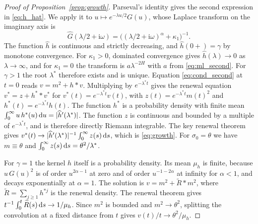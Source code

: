\begin{proof}[Proof of Proposition~\ref{prop:growth}] Parseval's identity gives the second expression in \eqref{eq:h_hat}. We apply it to $u\mapsto e^{-\lambda u/2}G(u)$, whose Laplace transform on the imaginary axis is
\begin{equation*}
\widehat G(\lambda/2+\mathrm{i}\omega)=\big((\lambda/2+\mathrm{i}\omega)^\alpha+\kappa_1\big)^{-1}.
\end{equation*}
The function $\widehat h$ is continuous and strictly decreasing, and $\widehat h(0+)=\gamma$ by monotone convergence. For $\kappa_1>0$, dominated convergence gives $\widehat h(\lambda)\to0$ as $\lambda\to\infty$, and for $\kappa_1=0$ the transform is $a\lambda^{-2H}$ with $a$ from \eqref{eq:ml_second}. For $\gamma>1$ the root $\lambda^*$ therefore exists and is unique. Equation \eqref{eq:cond_second} at $t=0$ reads $v=m^2+h*v$. Multiplying by $e^{-\lambda^*t}$ gives the renewal equation $v^*=z+h^**v^*$ for $v^*(t)=e^{-\lambda^*t}v(t)$, with $z(t)=e^{-\lambda^*t}m(t)^2$ and $h^*(t)=e^{-\lambda^*t}h(t)$. The function $h^*$ is a probability density with finite mean $\int_0^\infty u\,h^*(u)\,\mathrm{d} u=|\widehat h'(\lambda^*)|$. The function $z$ is continuous and bounded by a multiple of $e^{-\lambda^*t}$, and is therefore directly Riemann integrable. The key renewal theorem \citep[Chapter~XI]{Feller1971} gives $v^*(t)\to|\widehat h'(\lambda^*)|^{-1}\int_0^\infty z(s)\,\mathrm{d} s$, which is \eqref{eq:growth}. For $\sigma_0=\theta$ we have $m\equiv\theta$ and $\int_0^\infty z(s)\,\mathrm{d} s=\theta^2/\lambda^*$.

For $\gamma=1$ the kernel $h$ itself is a probability density. Its mean $\mu_h$ is finite, because $u\,G(u)^2$ is of order $u^{2\alpha-1}$ at zero and of order $u^{-1-2\alpha}$ at infinity for $\alpha<1$, and decays exponentially at $\alpha=1$. The solution is $v=m^2+\widetilde R*m^2$, where $\widetilde R=\sum_{j\ge1}h^{*j}$ is the renewal density. The renewal theorem gives $t^{-1}\int_0^t\widetilde R(s)\,\mathrm{d} s\to1/\mu_h$. Since $m^2$ is bounded and $m^2\to\theta^2$, splitting the convolution at a fixed distance from $t$ gives $v(t)/t\to\theta^2/\mu_h$.
\end{proof}

